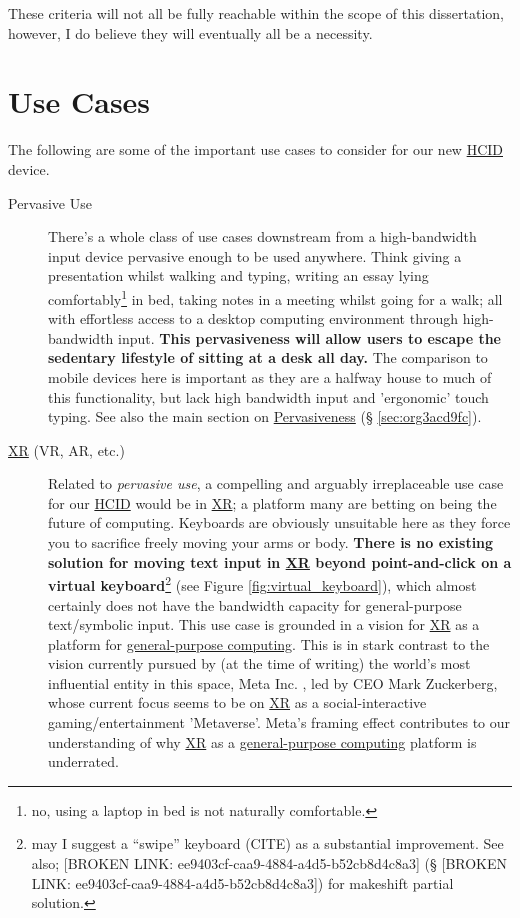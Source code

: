 \documentclass[logo,bsc,singlespacing,parskip]{infthesis}
\begin{document}
These criteria will not all be fully reachable within the scope of this dissertation, however, I do believe they will eventually all be a necessity.

\chapter{Use Cases}
\label{sec:org967c85c}
The following are some of the important use cases to consider for our new \hyperref[orgc00eca5]{HCID} device.

\begin{description}
\item[{Pervasive Use}] There's a whole class of use cases downstream from a high-bandwidth input device pervasive enough to be used anywhere.
Think giving a presentation whilst walking and typing, writing an essay lying comfortably\footnote{no, using a laptop in bed is not naturally comfortable.} in bed, taking notes in a meeting whilst going for a walk; all with effortless access to a desktop computing environment through high-bandwidth input.
\textbf{This pervasiveness will allow users to escape the sedentary lifestyle of sitting at a desk all day.}
The comparison to mobile devices here is important as they are a halfway house to much of this functionality, but lack high bandwidth input and 'ergonomic' touch typing.
See also the main section on \hyperref[sec:org3acd9fc]{Pervasiveness} (§ \ref{sec:org3acd9fc}).

\item[{\hyperref[org1d567af]{XR} (VR, AR, etc.)}] Related to \emph{pervasive use}, a compelling and arguably irreplaceable use case for our \hyperref[orgc00eca5]{HCID} would be in \hyperref[org1d567af]{XR}; a platform many are betting on being the future of computing.
Keyboards are obviously unsuitable here as they force you to sacrifice freely moving your arms or body.
\textbf{There is no existing solution for moving text input in \hyperref[org1d567af]{XR} beyond point-and-click on a virtual keyboard}\footnote{may I suggest a ``swipe'' keyboard (CITE) as a substantial improvement. See also; [BROKEN LINK: ee9403cf-caa9-4884-a4d5-b52cb8d4c8a3] (§ [BROKEN LINK: ee9403cf-caa9-4884-a4d5-b52cb8d4c8a3]) for makeshift partial solution.} (see Figure \ref{fig:virtual_keyboard}), which almost certainly does not have the bandwidth capacity for general-purpose text/symbolic input.
This use case is grounded in a vision for \hyperref[org1d567af]{XR} as a platform for \hyperref[orga7e7736]{general-purpose computing}.
This is in stark contrast to the vision currently pursued by (at the time of writing) the world's most influential entity in this space, Meta Inc. \autocite{WelcomeMetaMeta}, led by CEO Mark Zuckerberg, whose current focus seems to be on \hyperref[org1d567af]{XR} as a social-interactive gaming/entertainment 'Metaverse'.
Meta's framing effect contributes to our understanding of why \hyperref[org1d567af]{XR} as a \hyperref[orga7e7736]{general-purpose computing} platform is underrated.


\end{description}
\end{document}

